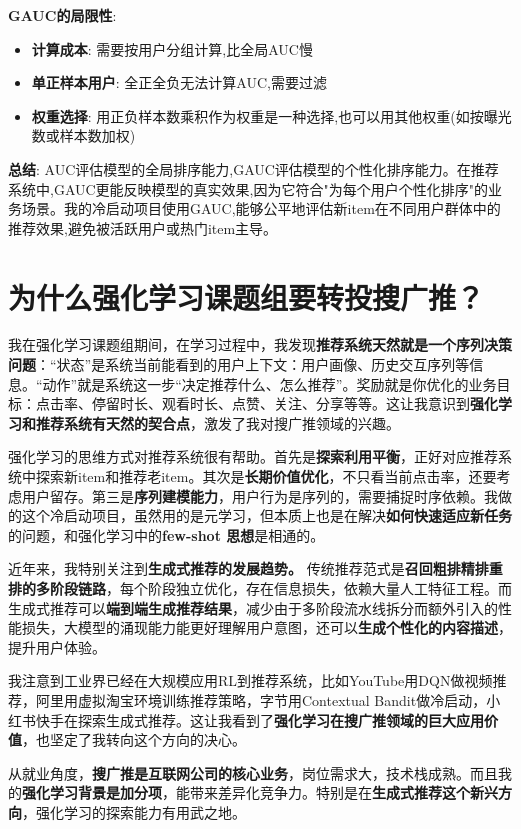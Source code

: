 \documentclass[UTF8]{ctexart}
\begin{document}
\textbf{GAUC的局限性}:

\begin{itemize}
    \item \textbf{计算成本}: 需要按用户分组计算,比全局AUC慢
    \item \textbf{单正样本用户}: 全正全负无法计算AUC,需要过滤
    \item \textbf{权重选择}: 用正负样本数乘积作为权重是一种选择,也可以用其他权重(如按曝光数或样本数加权)
\end{itemize}

\textbf{总结}: AUC评估模型的全局排序能力,GAUC评估模型的个性化排序能力。在推荐系统中,GAUC更能反映模型的真实效果,因为它符合"为每个用户个性化排序"的业务场景。我的冷启动项目使用GAUC,能够公平地评估新item在不同用户群体中的推荐效果,避免被活跃用户或热门item主导。

\section{为什么强化学习课题组要转投搜广推？}

我在强化学习课题组期间，在学习过程中，我发现\textbf{推荐系统天然就是一个序列决策问题}：“状态”是系统当前能看到的用户上下文：用户画像、历史交互序列等信息。“动作”就是系统这一步“决定推荐什么、怎么推荐”。奖励就是你优化的业务目标：点击率、停留时长、观看时长、点赞、关注、分享等等。这让我意识到\textbf{强化学习和推荐系统有天然的契合点}，激发了我对搜广推领域的兴趣。

强化学习的思维方式对推荐系统很有帮助。首先是\textbf{探索利用平衡}，正好对应推荐系统中探索新item和推荐老item。其次是\textbf{长期价值优化}，不只看当前点击率，还要考虑用户留存。第三是\textbf{序列建模能力}，用户行为是序列的，需要捕捉时序依赖。我做的这个冷启动项目，虽然用的是元学习，但本质上也是在解决\textbf{如何快速适应新任务}的问题，和强化学习中的\textbf{few-shot 思想}是相通的。

近年来，我特别关注到\textbf{生成式推荐的发展趋势。} 传统推荐范式是\textbf{召回粗排精排重排的多阶段链路}，每个阶段独立优化，存在信息损失，依赖大量人工特征工程。而生成式推荐可以\textbf{端到端生成推荐结果}，减少由于多阶段流水线拆分而额外引入的性能损失，大模型的涌现能力能更好理解用户意图，还可以\textbf{生成个性化的内容描述}，提升用户体验。

我注意到工业界已经在大规模应用RL到推荐系统，比如YouTube用DQN做视频推荐，阿里用虚拟淘宝环境训练推荐策略，字节用Contextual Bandit做冷启动，小红书快手在探索生成式推荐。这让我看到了\textbf{强化学习在搜广推领域的巨大应用价值}，也坚定了我转向这个方向的决心。

从就业角度，\textbf{搜广推是互联网公司的核心业务}，岗位需求大，技术栈成熟。而且我的\textbf{强化学习背景是加分项}，能带来差异化竞争力。特别是在\textbf{生成式推荐这个新兴方向}，强化学习的探索能力有用武之地。
\end{document}
